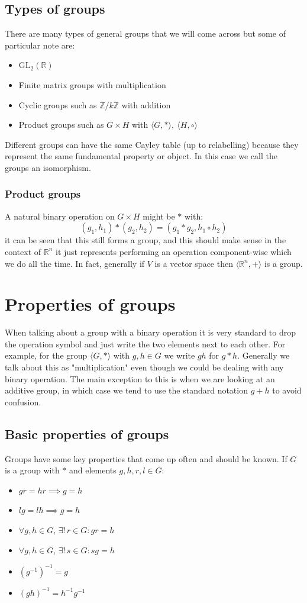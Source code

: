 \documentclass[12pt]{article}
\begin{document}
\subsection*{Types of groups}
There are many types of general groups that we will come across but some of particular note are:
\begin{itemize}
    \item \(\text{GL}_2(\mathbb{R})\)
    \item Finite matrix groups with multiplication
    \item Cyclic groups such as \(\mathbb{{Z}}/k\mathbb{Z}\) with addition
    \item Product groups such as \(G\times H\) with \(\langle G,*\rangle,\  \langle H,\circ\rangle\)
\end{itemize}
Different groups can have the same Cayley table (up to relabelling) because they represent the same fundamental property or object. In this case we call the groups an isomorphism.
\subsubsection*{Product groups}
A natural binary operation on \(G\times H\) might be \(*\) with:
\[(g_1,h_1)*(g_2,h_2)=(g_1*g_2,h_1\circ h_2)\]
it can be seen that this still forms a group, and this should make sense in the context of \(\mathbb{R}^n\) it just represents performing an operation component-wise which we do all the time. In fact, generally if \(V\) is a vector space then \(\langle\mathbb{R}^n,+\rangle\) is a group.
\section{Properties of groups}
When talking about a group with a binary operation it is very standard to drop the operation symbol and just write the two elements next to each other. For example, for the group \(\langle G,*\rangle\) with \(g,h\in G\) we write \(gh\) for \(g*h\). Generally we talk about this as "multiplication" even though we could be dealing with any binary operation. The main exception to this is when we are looking at an additive group, in which case we tend to use the standard notation \(g+h\) to avoid confusion.
\subsection*{Basic properties of groups}
Groups have some key properties that come up often and should be known. If \(G\) is a group with \(*\) and elements \(g,h,r,l\in G\):
\begin{itemize}
    \item \(gr=hr\implies g=h\)
    \item \(lg=lh\implies g=h\)
    \item \(\forall g,h\in G,\,\exists!\,r\in G:gr=h\)
    \item \(\forall g,h\in G,\,\exists!\,s\in G:sg=h\)
    \item \((g^{-1})^{-1}=g\)
    \item \((gh)^{-1}=h^{-1}g^{-1}\)
\end{itemize}
\end{document}
